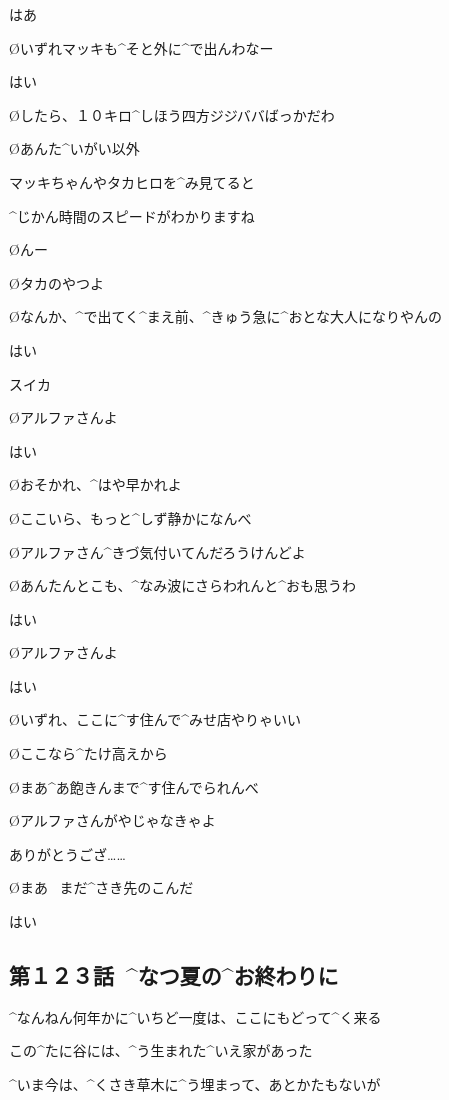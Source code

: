 \A はあ

\page
\O いずれマッキも^{そと}{外}に^{で}{出}んわなー

\A はい

\O したら、１０キロ^{しほう}{四方}ジジババばっかだわ

\O あんた^{いがい}{以外}

\page
\A マッキちゃんやタカヒロを^{み}{見}てると

\A ^{じかん}{時間}のスピードがわかりますね

\O んー

\O タカのやつよ

\O なんか、^{で}{出}てく^{まえ}{前}、^{きゅう}{急}に^{おとな}{大人}になりやんの

\page
\A はい

\Sign スイカ

\page
\O アルファさんよ

\A はい

\O おそかれ、^{はや}{早}かれよ

\O ここいら、もっと^{しず}{静}かになんべ

\page
\O アルファさん^{きづ}{気付}いてんだろうけんどよ

\O あんたんとこも、^{なみ}{波}にさらわれんと^{おも}{思}うわ

\A はい

\page
\O アルファさんよ

\A はい

\O いずれ、ここに^{す}{住}んで^{みせ}{店}やりゃいい

\O ここなら^{たけ}{高}えから

\O まあ^{あ}{飽}きんまで^{す}{住}んでられんべ

\page
\O アルファさんがやじゃなきゃよ

\A ありがとうござ……

\page[34]
\O まあ
\ まだ^{さき}{先}のこんだ

\A はい


\subsection{第１２３話\ ^{なつ}{夏}の^{お}{終}わりに}

\page[37]
\Y ^{なんねん}{何年}かに^{いちど}{一度}は、ここにもどって^{く}{来}る

\Y この^{たに}{谷}には、^{う}{生}まれた^{いえ}{家}があった

\Y ^{いま}{今}は、^{くさき}{草木}に^{う}{埋}まって、あとかたもないが

